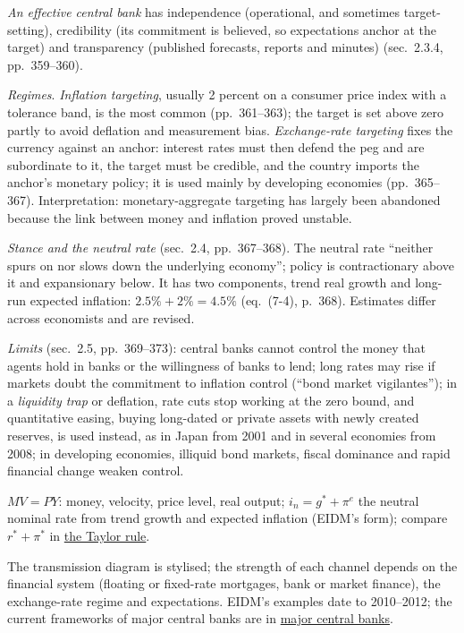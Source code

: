 \begin{qfdefinition}
\emph{An effective central bank} has independence (operational, and sometimes target-setting), credibility (its commitment is believed, so expectations anchor at the target) and transparency (published forecasts, reports and minutes) (sec.~2.3.4, pp.~359--360).

\emph{Regimes}. \emph{Inflation targeting}, usually 2 percent on a consumer price index with a tolerance band, is the most common (pp.~361--363); the target is set above zero partly to avoid deflation and measurement bias. \emph{Exchange-rate targeting} fixes the currency against an anchor: interest rates must then defend the peg and are subordinate to it, the target must be credible, and the country imports the anchor's monetary policy; it is used mainly by developing economies (pp.~365--367). Interpretation: monetary-aggregate targeting has largely been abandoned because the link between money and inflation proved unstable.

\emph{Stance and the neutral rate} (sec.~2.4, pp.~367--368). The neutral rate ``neither spurs on nor slows down the underlying economy''; policy is contractionary above it and expansionary below. It has two components, trend real growth and long-run expected inflation: $2.5\%+2\%=4.5\%$ (eq.~(7-4), p.~368). Estimates differ across economists and are revised.

\emph{Limits} (sec.~2.5, pp.~369--373): central banks cannot control the money that agents hold in banks or the willingness of banks to lend; long rates may rise if markets doubt the commitment to inflation control (``bond market vigilantes''); in a \emph{liquidity trap} or deflation, rate cuts stop working at the zero bound, and quantitative easing, buying long-dated or private assets with newly created reserves, is used instead, as in Japan from 2001 and in several economies from 2008; in developing economies, illiquid bond markets, fiscal dominance and rapid financial change weaken control.

 $MV=PY$: money, velocity, price level, real output; $i_n=g^*+\pi^e$ the neutral nominal rate from trend growth and expected inflation (EIDM's form); compare $r^*+\pi^*$ in \hyperref[mod:taylor-rule]{the Taylor rule}.

 The transmission diagram is stylised; the strength of each channel depends on the financial system (floating or fixed-rate mortgages, bank or market finance), the exchange-rate regime and expectations. EIDM's examples date to 2010--2012; the current frameworks of major central banks are in \hyperref[rule:major-central-banks-current]{major central banks}.


\end{qfdefinition}
